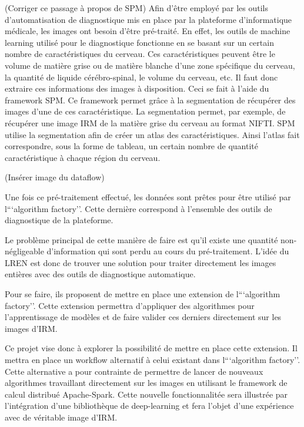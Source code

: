 \documentclass[a4paper,10pt,openany,oneside]{sphinxmanual}
\begin{document}
(Corriger ce passage à propos de SPM)
Afin d'être employé par les outils d'automatisation de diagnostique mis en place par la plateforme d'informatique médicale,
les images ont besoin d'être pré-traité. En effet, les outils de machine learning utilisé pour le diagnostique fonctionne
en se basant sur un certain nombre de caractéristiques du cerveau. Ces caractéristiques peuvent être le volume de matière
grise ou de matière blanche d'une zone spécifique du cerveau, la quantité de liquide cérébro-spinal, le volume du cerveau, etc.
Il faut donc extraire ces informations des images à disposition. Ceci se fait à l'aide du framework SPM. Ce framework permet
grâce à la segmentation de récupérer des images d'une de ces caractéristique. La segmentation permet, par exemple, de récupérer
une image IRM de la matière grise du cerveau au format NIFTI. SPM utilise la segmentation afin de créer un atlas des caractéristiques.
Ainsi l'atlas fait correspondre, sous la forme de tableau, un certain nombre de quantité caractéristique à chaque région du cerveau.

(Insérer image du dataflow)

Une fois ce pré-traitement effectué, les données sont prêtes pour être utilisé par l```algorithm factory''. Cette dernière correspond
à l'ensemble des outils de diagnostique de la plateforme.

Le problème principal de cette manière de faire est qu'il existe une quantité non-négligeable d'information qui sont perdu au cours
du pré-traitement. L'idée du LREN est donc de trouver une solution pour traiter directement les images entières avec des outils de
diagnostique automatique.

Pour se faire, ils proposent de mettre en place une extension de l```algorithm factory''. Cette extension permettra d'appliquer des algorithmes
pour l'apprentissage de modèles et de faire valider ces derniers directement sur les images d'IRM.

Ce projet vise donc à explorer la possibilité de mettre en place cette extension. Il mettra en place un workflow alternatif à celui
existant dans l```algorithm factory''. Cette alternative a pour contrainte de permettre de lancer de nouveaux algorithmes travaillant
directement sur les images en utilisant le framework de calcul distribué Apache-Spark. Cette nouvelle fonctionnalitée sera illustrée
par l'intégration d'une bibliothèque de deep-learning et fera l'objet d'une expérience avec de véritable image d'IRM.
\end{document}
